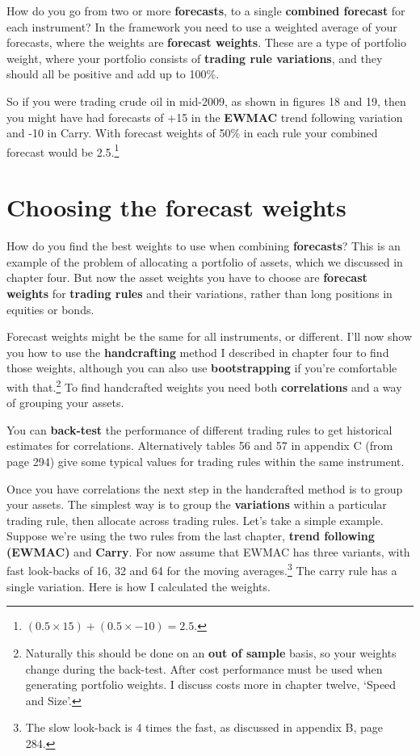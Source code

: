 How do you go from two or more \textbf{forecasts}, to a single \textbf{combined forecast} for each instrument? In the framework you need to use a weighted average of your forecasts, where the weights are \textbf{forecast weights}. These are a type of portfolio weight, where your portfolio consists of \textbf{trading rule variations}, and they should all be positive and add up to 100\%.

So if you were trading crude oil in mid-2009, as shown in figures 18 and 19, then you might have had forecasts of +15 in the \textbf{EWMAC} trend following variation and -10 in Carry. With forecast weights of 50\% in each rule your combined forecast would be 2.5.\footnote{\((0.5 \times 15) + (0.5 \times -10) = 2.5\).}

\section*{Choosing the forecast weights}  {}

How do you find the best weights to use when combining \textbf{forecasts}? This is an example of the problem of allocating a portfolio of assets, which we discussed in chapter four. But now the asset weights you have to choose are \textbf{forecast weights} for \textbf{trading rules} and their variations, rather than long positions in equities or bonds.

Forecast weights might be the same for all instruments, or different. I'll now show you how to use the \textbf{handcrafting} method I described in chapter four to find those weights, although you can also use \textbf{bootstrapping} if you're comfortable with that.\footnote{Naturally this should be done on an \textbf{out of sample} basis, so your weights change during the back-test. After cost performance must be used when generating portfolio weights. I discuss costs more in chapter twelve, ‘Speed and Size'.} To find handcrafted weights you need both \textbf{correlations} and a way of grouping your assets.

You can \textbf{back-test} the performance of different trading rules to get historical estimates for correlations. Alternatively tables 56 and 57 in appendix C (from page 294) give some typical values for trading rules within the same instrument.

Once you have correlations the next step in the handcrafted method is to group your assets. The simplest way is to group the \textbf{variations} within a particular trading rule, then allocate across trading rules. Let's take a simple example. Suppose we're using the two rules from the last chapter, \textbf{trend following (EWMAC)} and \textbf{Carry}. For now assume that EWMAC has three variants, with fast look-backs of 16, 32 and 64 for the moving averages.\footnote{The slow look-back is 4 times the fast, as discussed in appendix B, page 284.} The carry rule has a single variation. Here is how I calculated the weights.

